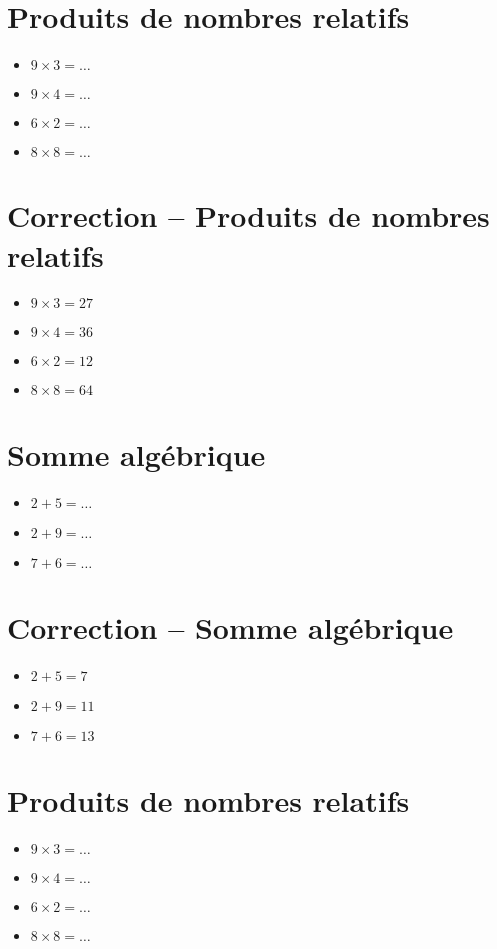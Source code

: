 \documentclass[a4paper,11pt,fleqn]{article}
\begin{document}
\section{Produits de nombres relatifs}
\begin{itemize}

  \item $9\times3=\ldots$
  \item $9\times4=\ldots$
  \item $6\times2=\ldots$
  \item $8\times8=\ldots$
\end{itemize}

\section{Correction -- Produits de nombres relatifs}
\begin{itemize}

  \item $9\times3=27$
  \item $9\times4=36$
  \item $6\times2=12$
  \item $8\times8=64$
\end{itemize}
\newpage
\setcounter{exo}{0}
\setcounter{section}{0}
\section{Somme algébrique}
\begin{itemize}

3
3
3
3
3
3
3
3
3
3
  \item $2+5=\ldots$
  \item $2+9=\ldots$
  \item $7+6=\ldots$
\end{itemize}

\section{Correction -- Somme algébrique}
\begin{itemize}

  \item $2+5=7$
  \item $2+9=11$
  \item $7+6=13$
\end{itemize}

\section{Produits de nombres relatifs}
\begin{itemize}

  \item $9\times3=\ldots$
  \item $9\times4=\ldots$
  \item $6\times2=\ldots$
  \item $8\times8=\ldots$
\end{itemize}
\end{document}
